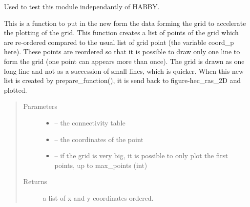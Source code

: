 \documentclass[letterpaper,10pt,english]{sphinxmanual}
\begin{document}

\begin{fulllineitems}
\label{\detokenize{index:src.hec_ras2D.main}}
Used to test this module independantly of HABBY.

\end{fulllineitems}


\begin{fulllineitems}
\label{\detokenize{index:src.hec_ras2D.prepare_grid}}
This is a function to put in the new form the data forming the grid to accelerate the plotting of the grid. This function creates
a list of points of the grid which are re-ordered compared to the usual list of grid point (the variable coord\_p
here). These points are reordered so that it is possible to draw only one line to form the grid (one point can
appears more than once). The grid is drawn as one long line and not as a succession of small lines, which is
quicker. When this new list is created by prepare\_function(), it is send back to figure-hec\_ras\_2D and plotted.
\begin{quote}\begin{description}
\item[{Parameters}] \leavevmode\begin{itemize}
\item {} 
 -- the connectivity table

\item {} 
 -- the coordinates of the point

\item {} 
 -- if the grid is very big, it is possible to only plot the first points, up to max\_points (int)

\end{itemize}

\item[{Returns}] \leavevmode
a list of x and y coordinates ordered.

\end{description}\end{quote}

\end{fulllineitems}
\end{document}
